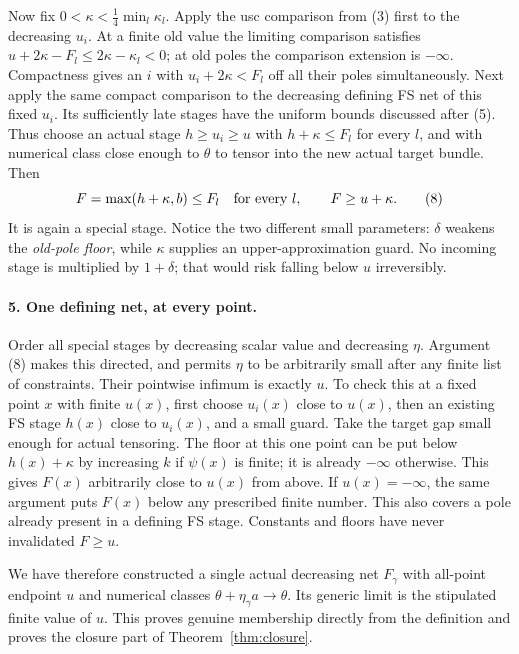 \documentclass[10pt]{article}
\begin{document}
Now fix $0<\kappa<\frac14\min_l\kappa_l$.
Apply the usc comparison from (3) first to the decreasing $u_i$.
At a finite old value the limiting comparison satisfies
$u+2\kappa-F_l\le2\kappa-\kappa_l<0$; at old poles the comparison
extension is $-\infty$. Compactness gives an $i$ with
$u_i+2\kappa<F_l$ off all their poles simultaneously.
Next apply the same compact comparison to the decreasing defining
FS net of this fixed $u_i$. Its sufficiently late stages have the
uniform bounds discussed after (5). Thus choose an actual stage
$h\ge u_i\ge u$ with
$h+\kappa\le F_l$ for every $l$, and with numerical class close
enough to $\theta$ to tensor into the new actual target bundle.
Then
\[
 F=\max(h+\kappa,b)\le F_l\quad\hbox{for every }l,
 \qquad F\ge u+\kappa.                                  \tag{8}
\]
It is again a special stage. Notice the two different small parameters:
$\delta$ weakens the \emph{old-pole floor}, while $\kappa$ supplies an
upper-approximation guard. No incoming stage is multiplied by
$1+\delta$; that would risk falling below $u$ irreversibly.

\paragraph{5. One defining net, at every point.}
Order all special stages by decreasing scalar value and decreasing
$\eta$. Argument (8) makes this directed, and permits $\eta$ to be
arbitrarily small after any finite list of constraints.
Their pointwise infimum is exactly $u$. To check this at a fixed
point $x$ with finite $u(x)$, first choose $u_i(x)$ close to $u(x)$,
then an existing FS stage $h(x)$ close to $u_i(x)$, and a small
guard. Take the target gap small enough for actual tensoring.
The floor at this one point can be put below $h(x)+\kappa$ by
increasing $k$ if $\psi(x)$ is finite; it is already $-\infty$ otherwise.
This gives $F(x)$ arbitrarily close to $u(x)$ from above.
If $u(x)=-\infty$, the same argument puts $F(x)$ below any prescribed
finite number. This also covers a pole already present in a defining
FS stage. Constants and floors have never invalidated $F\ge u$.

We have therefore constructed a single actual decreasing net
$F_\gamma$ with all-point endpoint $u$ and numerical classes
$\theta+\eta_\gamma a\to\theta$. Its generic limit is the stipulated
finite value of $u$. This proves genuine membership directly from
the definition and proves the closure part of Theorem~\ref{thm:closure}.
\end{document}
